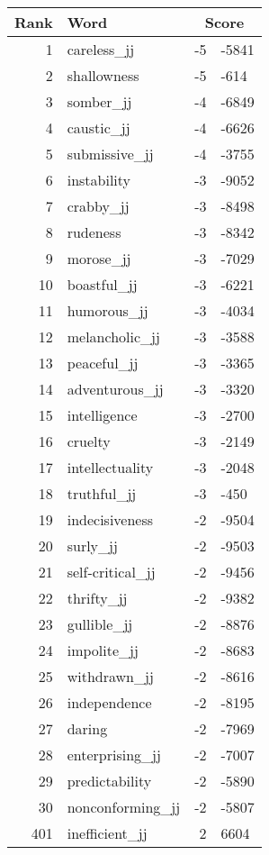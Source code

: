 \begin{longtable}[!htbp]{| rlr@{.}l |}
    \hline
    \textbf{Rank} & \textbf{Word} & \multicolumn{2}{c|}{\textbf{Score}} \\
    \hline
    \endhead
    1 & careless\_jj & -5 & -5841 \\
    2 & shallowness & -5 & -614 \\
    3 & somber\_jj & -4 & -6849 \\
    4 & caustic\_jj & -4 & -6626 \\
    5 & submissive\_jj & -4 & -3755 \\
    6 & instability & -3 & -9052 \\
    7 & crabby\_jj & -3 & -8498 \\
    8 & rudeness & -3 & -8342 \\
    9 & morose\_jj & -3 & -7029 \\
    10 & boastful\_jj & -3 & -6221 \\
    11 & humorous\_jj & -3 & -4034 \\
    12 & melancholic\_jj & -3 & -3588 \\
    13 & peaceful\_jj & -3 & -3365 \\
    14 & adventurous\_jj & -3 & -3320 \\
    15 & intelligence & -3 & -2700 \\
    16 & cruelty & -3 & -2149 \\
    17 & intellectuality & -3 & -2048 \\
    18 & truthful\_jj & -3 & -450 \\
    19 & indecisiveness & -2 & -9504 \\
    20 & surly\_jj & -2 & -9503 \\
    21 & self-critical\_jj & -2 & -9456 \\
    22 & thrifty\_jj & -2 & -9382 \\
    23 & gullible\_jj & -2 & -8876 \\
    24 & impolite\_jj & -2 & -8683 \\
    25 & withdrawn\_jj & -2 & -8616 \\
    26 & independence & -2 & -8195 \\
    27 & daring & -2 & -7969 \\
    28 & enterprising\_jj & -2 & -7007 \\
    29 & predictability & -2 & -5890 \\
    30 & nonconforming\_jj & -2 & -5807 \\
    401 & inefficient\_jj & 2 & 6604 \\

\end{longtable}
